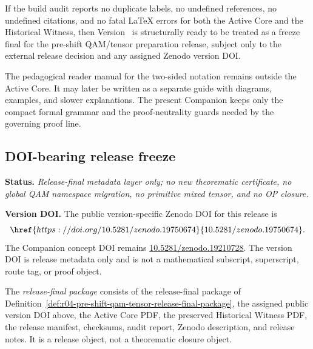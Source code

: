 \begin{corollary}
\label{cor:r04-freeze-readiness-condition}
If the build audit reports no duplicate labels, no undefined references, no undefined citations, and no fatal LaTeX errors for both the Active Core and the Historical Witness, then Version~\docversion{} is structurally ready to be treated as a freeze final for the  pre-shift QAM/tensor preparation release, subject only to the external release decision and any assigned Zenodo version DOI.
\end{corollary}

\begin{remark}
\label{rem:r04-reader-manual-separation}
The pedagogical reader manual for the two-sided notation remains outside the Active Core. It may later be written as a separate guide with diagrams, examples, and slower explanations. The present Companion keeps only the compact formal grammar and the proof-neutrality guards needed by the governing proof line.
\end{remark}



\subsection*{ DOI-bearing release freeze}
\label{subsec:v3350-doi-bearing-release-freeze}

\noindent\textbf{Status.} \emph{Release-final metadata layer only; no new theorematic certificate, no global QAM namespace migration, no primitive mixed tensor, and no OP closure.}\par
\noindent\textbf{Version DOI.} The public version-specific Zenodo DOI for this release is
\[
 \href{https://doi.org/10.5281/zenodo.19750674}{10.5281/zenodo.19750674}.
\]
The Companion concept DOI remains \href{https://doi.org/10.5281/zenodo.19210728}{10.5281/zenodo.19210728}. The version DOI is release metadata only and is not a mathematical subscript, superscript, route tag, or proof object.

\begin{definition}
\label{def:v3350-release-final-package}
The \emph{ release-final package} consists of the release-final package of Definition~\ref{def:r04-pre-shift-qam-tensor-release-final-package}, the assigned public version DOI above, the Active Core PDF, the preserved Historical Witness PDF, the release manifest, checksums, audit report, Zenodo description, and release notes. It is a release object, not a theorematic closure object.
\end{definition}

